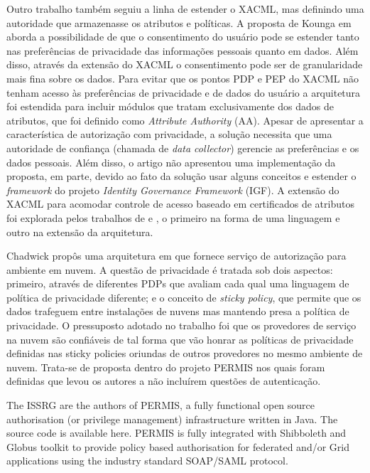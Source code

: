 \documentclass{doublecol-new}
\begin{document}
Outro trabalho \cite{kounga2010extending} também seguiu a linha de estender o XACML, mas definindo uma autoridade que armazenasse os atributos e políticas. A proposta de Kounga em \cite{kounga2010extending} aborda a possibilidade de que o consentimento do usuário pode se estender tanto nas preferências de privacidade das informações pessoais quanto em dados. Além disso, através da extensão do XACML o consentimento pode ser de granularidade mais fina sobre os dados. Para evitar que os pontos PDP e PEP do XACML não tenham acesso às preferências de privacidade e de dados do usuário a arquitetura foi estendida para incluir módulos que tratam exclusivamente dos dados de atributos, que foi definido como \textit{Attribute Authority} (AA). Apesar de apresentar a característica de autorização com privacidade, a solução necessita que uma autoridade de confiança (chamada de \textit{data collector}) gerencie as preferências e os dados pessoais. Além disso, o artigo não apresentou uma implementação da proposta, em parte, devido ao fato da solução usar alguns conceitos e estender o \textit{framework} do projeto \textit{Identity Governance Framework} (IGF). A extensão do XACML para acomodar controle de acesso baseado em certificados de atributos foi explorada pelos trabalhos de \citep{camenisch2009credential} e \citep{dagdee2011extending}, o primeiro na forma de uma linguagem e outro na extensão da arquitetura.

Chadwick propôs uma arquitetura em \cite{chadwick2012privacy} que fornece serviço de autorização para ambiente em nuvem. A questão de privacidade é tratada sob dois aspectos: primeiro, através de diferentes PDPs que avaliam cada qual uma linguagem de política de privacidade diferente; e o conceito de \textit{sticky policy}, que permite que os dados trafeguem entre instalações de nuvens mas mantendo presa a política de privacidade. O pressuposto adotado no trabalho foi que os provedores de serviço na nuvem são confiáveis de tal forma que vão honrar as políticas de privacidade definidas nas sticky policies oriundas de outros provedores no mesmo ambiente de nuvem. Trata-se de proposta dentro do projeto PERMIS nos quais foram definidas que levou os autores a não incluírem questões de autenticação.


The ISSRG are the authors of PERMIS, a fully functional open source authorisation (or privilege management) infrastructure written in Java. The source code is available here. PERMIS is fully integrated with Shibboleth and Globus toolkit to provide policy based authorisation for federated and/or Grid applications using the industry standard SOAP/SAML protocol. 
\end{document}
